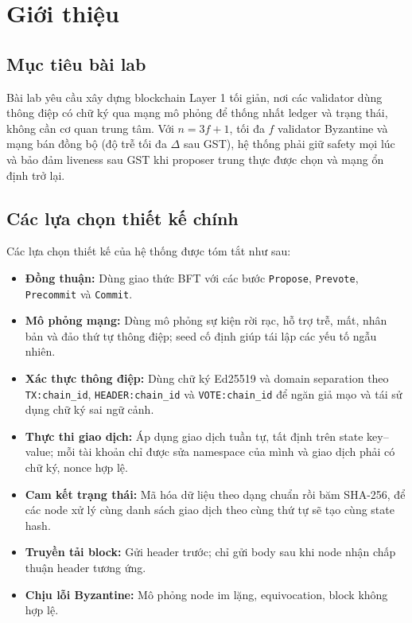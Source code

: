 \section{Giới thiệu}
\label{sec:introduction}

\subsection{Mục tiêu bài lab}
Bài lab yêu cầu xây dựng blockchain Layer 1 tối giản, nơi các validator dùng thông điệp có chữ ký qua mạng mô phỏng để thống nhất ledger và trạng thái, không cần cơ quan trung tâm. Với $n=3f+1$, tối đa $f$ validator Byzantine và mạng bán đồng bộ (độ trễ tối đa $\Delta$ sau GST), hệ thống phải giữ safety mọi lúc và bảo đảm liveness sau GST khi proposer trung thực được chọn và mạng ổn định trở lại.


\subsection{Các lựa chọn thiết kế chính}

Các lựa chọn thiết kế của hệ thống được tóm tắt như sau:
\begin{itemize}
    \item \textbf{Đồng thuận:} Dùng giao thức BFT với các bước \texttt{Propose}, \texttt{Prevote}, \texttt{Precommit} và \texttt{Commit}.
    \item \textbf{Mô phỏng mạng:} Dùng mô phỏng sự kiện rời rạc, hỗ trợ trễ, mất, nhân bản và đảo thứ tự thông điệp; seed cố định giúp tái lập các yếu tố ngẫu nhiên.
    \item \textbf{Xác thực thông điệp:} Dùng chữ ký Ed25519 và domain separation theo \texttt{TX:chain\_id}, \texttt{HEADER:chain\_id} và \texttt{VOTE:chain\_id} để ngăn giả mạo và tái sử dụng chữ ký sai ngữ cảnh.
    \item \textbf{Thực thi giao dịch:} Áp dụng giao dịch tuần tự, tất định trên state key--value; mỗi tài khoản chỉ được sửa namespace của mình và giao dịch phải có chữ ký, nonce hợp lệ.
    \item \textbf{Cam kết trạng thái:} Mã hóa dữ liệu theo dạng chuẩn rồi băm SHA-256, để các node xử lý cùng danh sách giao dịch theo cùng thứ tự sẽ tạo cùng state hash.
    \item \textbf{Truyền tải block:} Gửi header trước; chỉ gửi body sau khi node nhận chấp thuận header tương ứng.
    \item \textbf{Chịu lỗi Byzantine:} Mô phỏng node im lặng, equivocation, block không hợp lệ.
\end{itemize}
